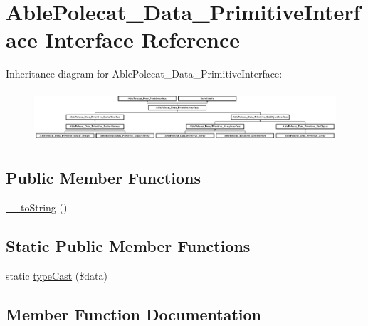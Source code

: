 \hypertarget{interface_able_polecat___data___primitive_interface}{}\section{Able\+Polecat\+\_\+\+Data\+\_\+\+Primitive\+Interface Interface Reference}
\label{interface_able_polecat___data___primitive_interface}
Inheritance diagram for Able\+Polecat\+\_\+\+Data\+\_\+\+Primitive\+Interface\+:\begin{figure}[H]
\begin{center}
\leavevmode
\includegraphics[height=1.944444cm]{interface_able_polecat___data___primitive_interface}
\end{center}
\end{figure}
\subsection*{Public Member Functions}
\begin{DoxyCompactItemize}
\item 
\hyperlink{interface_able_polecat___data___primitive_interface_a7516ca30af0db3cdbf9a7739b48ce91d}{\+\_\+\+\_\+to\+String} ()
\end{DoxyCompactItemize}
\subsection*{Static Public Member Functions}
\begin{DoxyCompactItemize}
\item 
static \hyperlink{interface_able_polecat___data___primitive_interface_a68640750b79d1cdda3cddcece68a207e}{type\+Cast} (\$data)
\end{DoxyCompactItemize}


\subsection{Member Function Documentation}
\hypertarget{interface_able_polecat___data___primitive_interface_a7516ca30af0db3cdbf9a7739b48ce91d}{}
